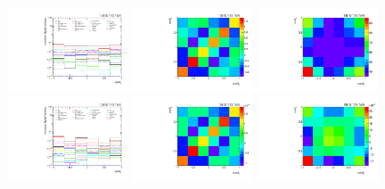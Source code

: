 \begin{figure}[htb]
\begin{center}
 \includegraphics[width=0.32\textwidth]{fig_fullRun2UL/unfolding/combined/deltaSystCombinedlog_rebinnedB_b2r.pdf}
 \includegraphics[width=0.32\textwidth]{fig_fullRun2UL/unfolding/combined/StatCovMatrix_rebinnedB_b2r.pdf}
 \includegraphics[width=0.32\textwidth]{fig_fullRun2UL/unfolding/combined/TotalSystCovMatrix_rebinnedB_b2r.pdf} \\
 \includegraphics[width=0.32\textwidth]{fig_fullRun2UL/unfolding/combined/deltaSystCombinedlogNorm_rebinnedB_b2r.pdf}
 \includegraphics[width=0.32\textwidth]{fig_fullRun2UL/unfolding/combined/StatCovMatrixNorm_rebinnedB_b2r.pdf}
 \includegraphics[width=0.32\textwidth]{fig_fullRun2UL/unfolding/combined/TotalSystCovMatrixNorm_rebinnedB_b2r.pdf} \\

\end{center}
\end{figure}
